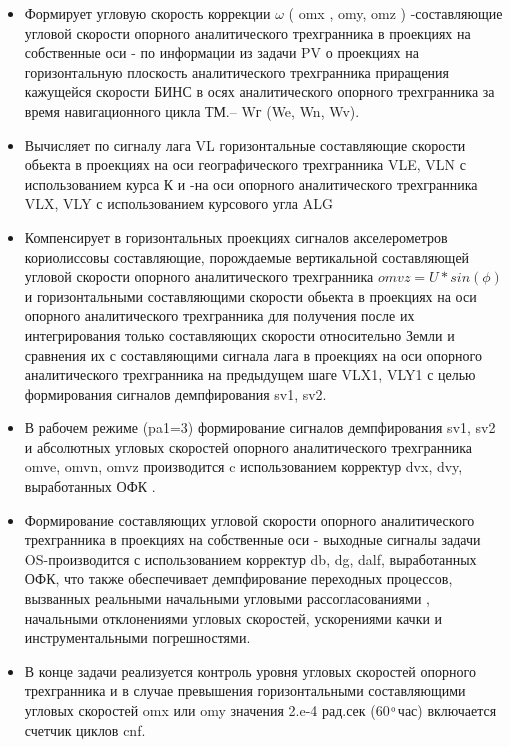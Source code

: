 \begin{itemize}
    \item Формирует угловую скорость коррекции $\omega$  ( omx ,  omy,  omz ) -составляющие   угловой скорости   опорного   аналитического   
    трехгранника в проекциях  на собственные оси  - 
    по информации из задачи  PV о проекциях на горизонтальную плоскость аналитического трехгранника  приращения  кажущейся скорости БИНС 
    в осях аналитического  опорного трехгранника  за время  навигационного  цикла  ТМ.-- Wг (We, Wn, Wv).  
    \item Вычисляет по сигналу лага  VL  горизонтальные  составляющие скорости   обьекта в  проекциях  на оси  географического трехгранника VLE, 
    VLN с использованием курса К и -на оси  опорного   аналитического   трехгранника  VLX,  VLY с использованием курсового  угла  ALG 
    \item Компенсирует в  горизонтальных проекциях сигналов акселерометров кориолиссовы составляющие,  порождаемые вертикальной составляющей угловой 
    скорости  опорного   аналитического   трехгранника $omvz=U*sin(\phi)$  и  горизонтальными  составляющими скорости   обьекта в проекциях  на 
    оси  опорного   аналитического   трехгранника  для получения после их интегрирования  только составляющих скорости относительно Земли и  
    сравнения их с составляющими  сигнала  лага  в проекциях  на оси  опорного   аналитического   трехгранника   на предыдущем  шаге  
    VLX1,  VLY1  с  целью  формирования сигналов демпфирования   sv1,   sv2.
    \item В рабочем режиме (pa1=3) формирование сигналов демпфирования  sv1, sv2 и  абсолютных угловых скоростей опорного  аналитического  трехгранника  
    omve,  omvn,   omvz  производится  c  использованием корректур  dvx,   dvy,  выработанных  ОФК .
    \item Формирование  составляющих угловой скорости опорного   аналитического  трехгранника в проекциях  на собственные оси - выходные сигналы 
    задачи   OS-производится  с использованием корректур  db,   dg,   dalf,   выработанных  ОФК, что также обеспечивает демпфирование переходных 
    процессов, вызванных реальными начальными угловыми рассогласованиями , начальными отклонениями угловых скоростей, 
    ускорениями качки и инструментальными погрешностями.
    \item В конце задачи реализуется   контроль  уровня  угловых скоростей опорного трехгранника  и в случае  превышения  горизонтальными составляющими 
    угловых скоростей omx  или  omy  значения 2.e-4  рад.сек  (60  ͦ час)  включается счетчик циклов  cnf.
\end{itemize}

